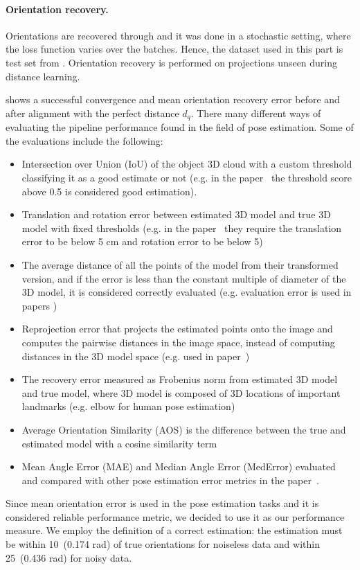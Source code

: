 \paragraph{Orientation recovery.}
Orientations are recovered through  and it was done in a stochastic setting, where the loss function varies over the batches.
Hence, the dataset used in this part is test set from .
Orientation recovery is performed on projections unseen during distance learning.

 shows a successful convergence and mean orientation recovery error before and after alignment with the perfect distance $d_q$.
There many different ways of evaluating the pipeline performance found in the field of pose estimation. Some of the evaluations include the following:
 
\begin{itemize}
\item Intersection over Union (IoU) of the object 3D cloud with a custom threshold classifying it as a good estimate or not (e.g. in the paper~\cite{10.1007/s11263-014-0733-5} the threshold score above 0.5 is considered good estimation).
\item Translation and rotation error between estimated 3D model and true 3D model with fixed thresholds (e.g. in the paper~\cite{shotton2013scene} they require the translation error to be below 5 cm and rotation error to be below 5\degree)
\item The average distance of all the points of the model from their transformed version, and if the error is less than the constant multiple of diameter of the 3D model, it is considered correctly evaluated (e.g. evaluation error is used in papers \cite{10.1007/978-3-642-37331-2_42, xiang2018posecnn})
\item Reprojection error that projects the estimated points onto the image and computes the pairwise distances in the image space, instead of computing distances in the 3D model space (e.g. used in paper~\cite{xiang2018posecnn})
\item The recovery error measured as Frobenius norm from estimated 3D model and true model, where 3D model is composed of 3D locations of important landmarks (e.g. elbow for human pose estimation)~\cite{wangni2018monocular}
\item Average Orientation Similarity (AOS) is the difference between the true and estimated model with a cosine similarity term~\cite{RedondoCabrera2016PoseEE}
\item Mean Angle Error (MAE) and Median Angle Error (MedError) evaluated and compared with other pose estimation error metrics in the paper~\cite{RedondoCabrera2016PoseEE}.
\end{itemize}
Since mean orientation error is used in the pose estimation tasks and it is considered reliable performance metric, we decided to use it as our performance measure. We employ the definition of a correct estimation: the estimation must be within 10\degree~(0.174 rad) of true orientations for noiseless data and within 25\degree~(0.436 rad) for noisy data.

